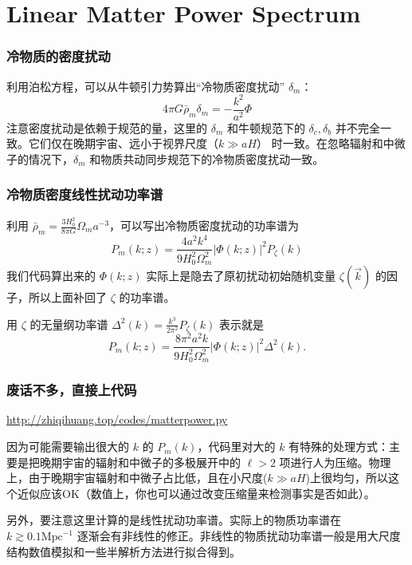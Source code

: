 \documentclass[CJK,13pt]{beamer}
\date{}
\begin{document}
  \bch


  
  \section{Linear Matter Power Spectrum}

  
  \begin{frame}
    \frametitle{冷物质的密度扰动}
    利用泊松方程，可以从牛顿引力势算出“冷物质密度扰动” $\delta_m$：
    $$ 4\pi G\bar{\rho}_m \delta_m = -\frac{k^2}{a^2}\Phi $$
    注意密度扰动是依赖于规范的量，这里的 $\delta_m$ 和牛顿规范下的 $\delta_c, \delta_b$ 并不完全一致。它们仅在晚期宇宙、远小于视界尺度（$k\gg aH$） 时一致。在忽略辐射和中微子的情况下，$\delta_m$ 和物质共动同步规范下的冷物质密度扰动一致。
  \end{frame}

  \begin{frame}
    \frametitle{冷物质密度线性扰动功率谱}
    利用 $\bar{\rho}_m = \frac{3H_0^2}{8\pi G}\Omega_m a^{-3}$，可以写出冷物质密度扰动的功率谱为
    $$P_m(k; z) = \frac{4a^2k^4}{9H_0^2\Omega_m^2} \lvert\Phi(k;z)\rvert^2 P_\zeta(k)$$
    我们代码算出来的 $\Phi(k; z)$ 实际上是隐去了原初扰动初始随机变量 $\zeta(\vec{k})$ 的因子，所以上面补回了 $\zeta$ 的功率谱。

    用 $\zeta$ 的无量纲功率谱  $\Delta^2(k)=\frac{k^3}{2\pi^2}P_\zeta(k)$ 表示就是
    $$P_m(k; z) = \frac{8\pi^2a^2k}{9H_0^2\Omega_m^2} \lvert\Phi(k;z)\rvert^2 \Delta^2(k).$$
  \end{frame}


  \begin{frame}
    \frametitle{废话不多，直接上代码}
    \url{http://zhiqihuang.top/codes/matterpower.py}

    \skipline
    
    因为可能需要输出很大的 $k$ 的 $P_m(k)$，代码里对大的 $k$ 有特殊的处理方式：主要是把晚期宇宙的辐射和中微子的多极展开中的 $\ell>2$ 项进行人为压缩。物理上，由于晚期宇宙辐射和中微子占比低，且在小尺度($k\gg aH$)上很均匀，所以这个近似应该OK（数值上，你也可以通过改变压缩量来检测事实是否如此）。

    \skipline
    
    另外，要注意这里计算的是线性扰动功率谱。实际上的物质功率谱在 $k\gtrsim 0.1\mathrm{Mpc}^{-1}$ 逐渐会有非线性的修正。非线性的物质扰动功率谱一般是用大尺度结构数值模拟和一些半解析方法进行拟合得到。
  \end{frame}
\end{document}
